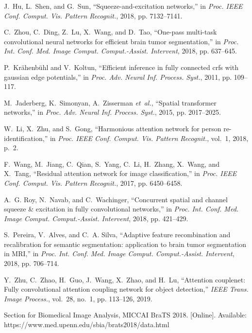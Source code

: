 \documentclass[journal,twoside]{IEEEtran}
\begin{document}
\begin{thebibliography}{55}
J.~Hu, L.~Shen, and G.~Sun, ``Squeeze-and-excitation networks,'' in \emph{Proc. IEEE Conf. Comput. Vis. Pattern Recognit.}, 2018, pp. 7132--7141.

C.~Zhou, C.~Ding, Z.~Lu, X.~Wang, and D.~Tao, ``One-pass multi-task convolutional neural networks for efficient brain tumor segmentation,'' in
\emph{Proc. Int. Conf. Med. Image Comput. Comput.-Assist. Intervent}, 2018, pp. 637--645.

P.~Kr{\"a}henb{\"u}hl and V.~Koltun, ``Efficient inference in fully connected crfs with gaussian edge potentials,'' in \emph{Proc. Adv. Neural Inf. Process. Syst.}, 2011, pp. 109--117.

M.~Jaderberg, K.~Simonyan, A.~Zisserman \emph{et~al.}, ``Spatial transformer networks,'' in \emph{Proc. Adv. Neural Inf. Process. Syst.}, 2015, pp. 2017--2025.

W.~Li, X.~Zhu, and S.~Gong, ``Harmonious attention network for person re-identification,'' in \emph{Proc. IEEE Conf. Comput. Vis. Pattern Recognit.}, vol.~1, 2018, p.~2.

F.~Wang, M.~Jiang, C.~Qian, S.~Yang, C.~Li, H.~Zhang, X.~Wang, and X.~Tang, ``Residual attention network for image classification,'' in \emph{Proc. IEEE Conf. Comput. Vis. Pattern Recognit.}, 2017, pp. 6450--6458.

A.~G. Roy, N.~Navab, and C.~Wachinger, ``Concurrent spatial and channel squeeze \& excitation in fully convolutional networks,'' in \emph{Proc. Int. Conf. Med. Image Comput. Comput.-Assist. Intervent}, 2018, pp. 421--429.


S.~Pereira, V.~Alves, and C.~A. Silva, ``Adaptive feature recombination and recalibration for semantic segmentation: application to brain tumor segmentation in MRI,'' in \emph{Proc. Int. Conf. Med. Image Comput. Comput.-Assist. Intervent}, 2018, pp. 706--714.

Y.~Zhu, C.~Zhao, H.~Guo, J.~Wang, X.~Zhao, and H.~Lu, ``Attention couplenet: Fully convolutional attention coupling network for object detection,'' \emph{IEEE Trans. Image Process.}, vol.~28, no.~1, pp. 113--126, 2019.


Section for Biomedical Image Analysis, MICCAI BraTS 2018. [Online]. Available: https://www.med.upenn.edu/sbia/brats2018/data.html


\end{thebibliography}
\end{document}
